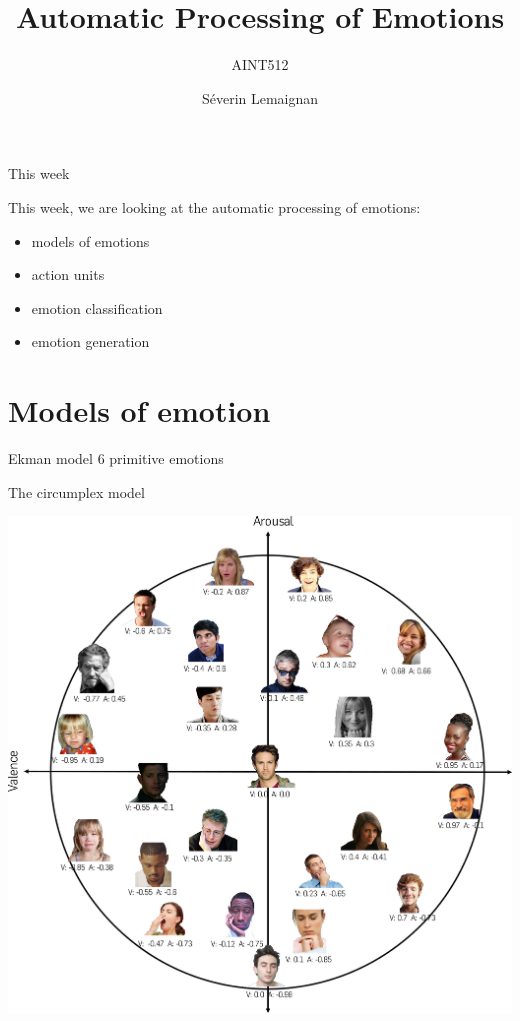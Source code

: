 \documentclass[compress]{beamer}
\title{Automatic Processing of Emotions}
\subtitle{AINT512}
\date{}
\author{Séverin Lemaignan}
\institute{Centre for Neural Systems and Robotics\\{\bf Plymouth University}}
\makeatletter
\let\beamer@writeslidentry@miniframeson=\beamer@writeslidentry
\def\beamer@writeslidentry@miniframesoff{%
  \expandafter\beamer@ifempty\expandafter{\beamer@framestartpage}{}%
  {%
    \clearpage\beamer@notesactions%
  }
}
\newcommand*{\miniframeson}{\let\beamer@writeslidentry=\beamer@writeslidentry@miniframeson}
\newcommand*{\miniframesoff}{\let\beamer@writeslidentry=\beamer@writeslidentry@miniframesoff}
\makeatother
\begin{document}
\miniframesoff


\maketitle


\begin{frame}{This week}

This week, we are looking at the automatic processing of emotions:

    \begin{itemize}
        \item models of emotions
        \item action units
        \item emotion classification
        \item emotion generation
    \end{itemize}

\end{frame}

\miniframeson

\section{Models of emotion}

\begin{frame}{Ekman model}
    6 primitive emotions
\end{frame}

\begin{frame}{The circumplex model}
    \begin{center}
        \includegraphics[width=0.8\linewidth]{AffectNet_circumplex}
    \end{center}
\end{frame}
\end{document}
